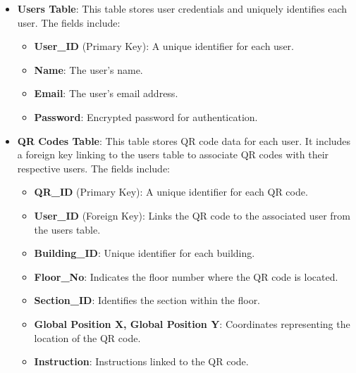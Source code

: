 \begin{itemize}
	\item \textbf{Users Table}: This table stores user credentials and uniquely identifies each user. The fields include:
	\begin{itemize}
		\item \textbf{User\_ID} (Primary Key): A unique identifier for each user.
		\item \textbf{Name}: The user's name.
		\item \textbf{Email}: The user's email address.
		\item \textbf{Password}: Encrypted password for authentication.
	\end{itemize}
	
	\item \textbf{QR Codes Table}: This table stores QR code data for each user. It includes a foreign key linking to the users table to associate QR codes with their respective users. The fields include:
	\begin{itemize}
		\item \textbf{QR\_ID} (Primary Key): A unique identifier for each QR code.
		\item \textbf{User\_ID} (Foreign Key): Links the QR code to the associated user from the users table.
		\item \textbf{Building\_ID}: Unique identifier for each building.
		\item \textbf{Floor\_No}: Indicates the floor number where the QR code is located.
		\item \textbf{Section\_ID}: Identifies the section within the floor.
		\item \textbf{Global Position X, Global Position Y}: Coordinates representing the location of the QR code.
		\item \textbf{Instruction}: Instructions linked to the QR code.
	\end{itemize}
\end{itemize}


